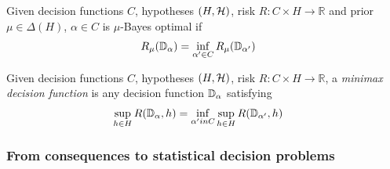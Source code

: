 \begin{definition}
Given decision functions $C$, hypotheses $(H,\mathcal{H})$, risk $R:C\times H\to \mathbb{R}$ and prior $\mu\in \Delta(H)$, $\alpha\in C$ is $\mu$-Bayes optimal if
\begin{align}
    R_\mu(\mathbb{D}_\alpha) &= \inf_{\alpha'\in C} R_{\mu}(\mathbb{D}_{\alpha'})
\end{align}
\end{definition}

\begin{definition}
Given decision functions $C$, hypotheses $(H,\mathcal{H})$, risk $R:C\times H\to \mathbb{R}$, a \emph{minimax decision function} is any decision function $\mathbb{D}_\alpha$ satisfying
\begin{align}
    \sup_{h\in H}  R(\mathbb{D}_\alpha,h) &= \inf_{\alpha' in C} \sup_{h\in H} R(\mathbb{D}_{\alpha'},h)
\end{align}
\end{definition}

\subsubsection{From consequences to statistical decision problems}\label{sec:cons_to_sdp}

